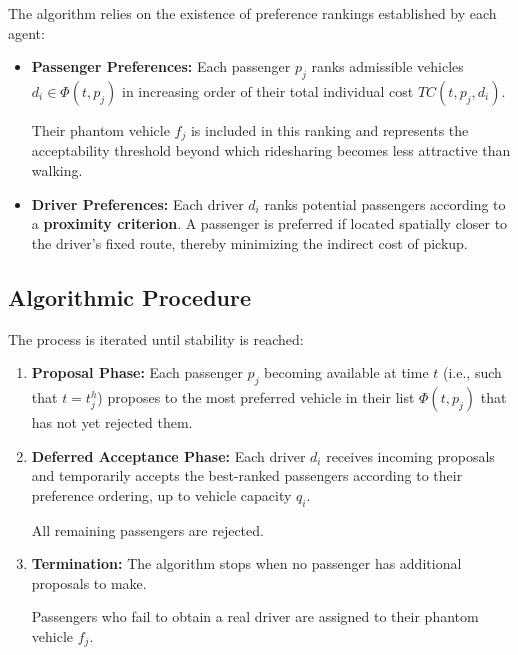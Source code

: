 \documentclass[12pt, a4paper]{article}
\begin{document}
The algorithm relies on the existence of preference rankings established by each agent:

\begin{itemize}

    \item \textbf{Passenger Preferences:}
    Each passenger $p_j$ ranks admissible vehicles $d_i\in\Phi(t,p_j)$ in increasing order of their total individual cost $TC(t,p_j,d_i)$.

    Their phantom vehicle $f_j$ is included in this ranking and represents the acceptability threshold beyond which ridesharing becomes less attractive than walking.

    \item \textbf{Driver Preferences:}
    Each driver $d_i$ ranks potential passengers according to a \textbf{proximity criterion}. A passenger is preferred if located spatially closer to the driver's fixed route, thereby minimizing the indirect cost of pickup.

\end{itemize}

\subsection{Algorithmic Procedure}

The process is iterated until stability is reached:

\begin{enumerate}

    \item \textbf{Proposal Phase:}
    Each passenger $p_j$ becoming available at time $t$ (i.e., such that $t=t_j^h$) proposes to the most preferred vehicle in their list $\Phi(t,p_j)$ that has not yet rejected them.

    \item \textbf{Deferred Acceptance Phase:}
    Each driver $d_i$ receives incoming proposals and temporarily accepts the best-ranked passengers according to their preference ordering, up to vehicle capacity $q_i$.

    All remaining passengers are rejected.

    \item \textbf{Termination:}
    The algorithm stops when no passenger has additional proposals to make.

    Passengers who fail to obtain a real driver are assigned to their phantom vehicle $f_j$.

\end{enumerate}
\end{document}
